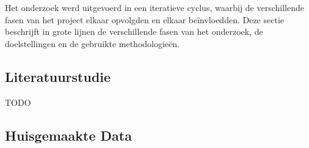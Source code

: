 
\chapter{}%
\label{ch:methodologie}


Het onderzoek werd uitgevoerd in een iteratieve cyclus, waarbij de verschillende fasen van het project elkaar opvolgden en elkaar beïnvloedden.
Deze sectie beschrijft in grote lijnen de verschillende fasen van het onderzoek, de doelstellingen en de gebruikte methodologieën.

\section{Literatuurstudie}

TODO

\section{Huisgemaakte Data}

